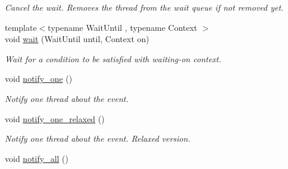 \begin{DoxyCompactItemize}
\begin{DoxyCompactList}\small\item\em Cancel the wait. Removes the thread from the wait queue if not removed yet. \end{DoxyCompactList}\item 
\hypertarget{classtbb_1_1internal_1_1concurrent__monitor_af7cee7cbc547277ae37b06325366530f}{}{\footnotesize template$<$typename Wait\+Until , typename Context $>$ }\\void \hyperlink{classtbb_1_1internal_1_1concurrent__monitor_af7cee7cbc547277ae37b06325366530f}{wait} (Wait\+Until until, Context on)\label{classtbb_1_1internal_1_1concurrent__monitor_af7cee7cbc547277ae37b06325366530f}

\begin{DoxyCompactList}\small\item\em Wait for a condition to be satisfied with waiting-\/on context. \end{DoxyCompactList}\item 
\hypertarget{classtbb_1_1internal_1_1concurrent__monitor_a2ef33e449ee8ede1d9413f4a814ee9cf}{}void \hyperlink{classtbb_1_1internal_1_1concurrent__monitor_a2ef33e449ee8ede1d9413f4a814ee9cf}{notify\+\_\+one} ()\label{classtbb_1_1internal_1_1concurrent__monitor_a2ef33e449ee8ede1d9413f4a814ee9cf}

\begin{DoxyCompactList}\small\item\em Notify one thread about the event. \end{DoxyCompactList}\item 
\hypertarget{classtbb_1_1internal_1_1concurrent__monitor_a24bfa3b8eae09a60d454e374620bd4dd}{}void \hyperlink{classtbb_1_1internal_1_1concurrent__monitor_a24bfa3b8eae09a60d454e374620bd4dd}{notify\+\_\+one\+\_\+relaxed} ()\label{classtbb_1_1internal_1_1concurrent__monitor_a24bfa3b8eae09a60d454e374620bd4dd}

\begin{DoxyCompactList}\small\item\em Notify one thread about the event. Relaxed version. \end{DoxyCompactList}\item 
\hypertarget{classtbb_1_1internal_1_1concurrent__monitor_a9caaa87d7f556a282ab01886ac63e38b}{}void \hyperlink{classtbb_1_1internal_1_1concurrent__monitor_a9caaa87d7f556a282ab01886ac63e38b}{notify\+\_\+all} ()\label{classtbb_1_1internal_1_1concurrent__monitor_a9caaa87d7f556a282ab01886ac63e38b}


\end{DoxyCompactItemize}
